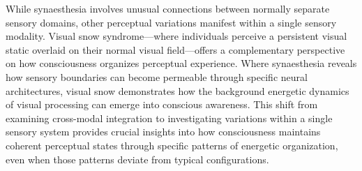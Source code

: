 While synaesthesia involves unusual connections between normally separate sensory domains, other perceptual variations manifest within a single sensory modality. Visual snow syndrome—where individuals perceive a persistent visual static overlaid on their normal visual field—offers a complementary perspective on how consciousness organizes perceptual experience. Where synaesthesia reveals how sensory boundaries can become permeable through specific neural architectures, visual snow demonstrates how the background energetic dynamics of visual processing can emerge into conscious awareness. This shift from examining cross-modal integration to investigating variations within a single sensory system provides crucial insights into how consciousness maintains coherent perceptual states through specific patterns of energetic organization, even when those patterns deviate from typical configurations.
